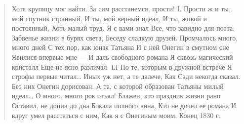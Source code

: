 \begin{verse}
Хотя крупицу мог найти.
За сим расстанемся, прости!
L
Прости ж и ты, мой спутник странный,
И ты, мой верный идеал,
И ты, живой и постоянный,
Хоть малый труд. Я с вами знал
Все, что завидно для поэта:
Забвенье жизни в бурях света,
Беседу сладкую друзей.
Промчалось много, много дней
С тех пор, как юная Татьяна
И с ней Онегин в смутном сне
Явилися впервые мне —
И даль свободного романа
Я сквозь магический кристалл
Еще не ясно различал.
LI
Но те, которым в дружной встрече
Я строфы первые читал…
Иных уж нет, а те далече,
Как Сади некогда сказал.
Без них Онегин дорисован.
А та, с которой образован
Татьяны милый идеал…
О много, много рок отъял!
Блажен, кто праздник жизни рано
Оставил, не допив до дна
Бокала полного вина,
Кто не дочел ее романа
И вдруг умел расстаться с ним,
Как я с Онегиным моим.
Конец
1830 г.
\end{verse}